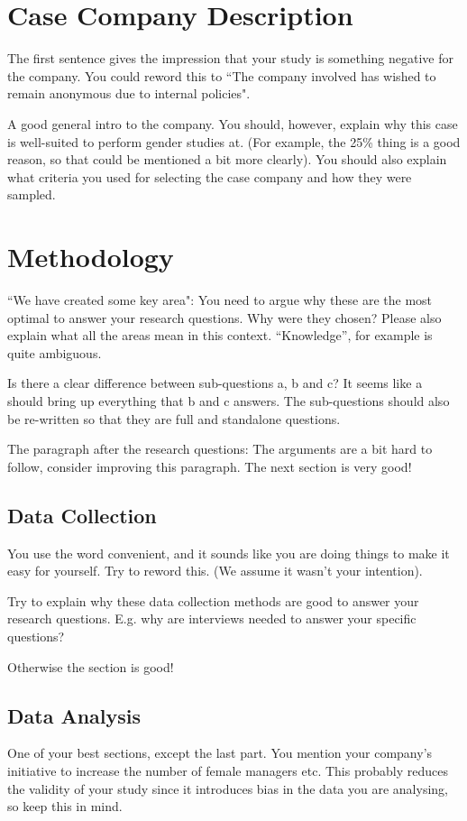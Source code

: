 \documentclass[times, 10pt,twocolumn]{article}
\begin{document}
\section{Case Company Description}
The first sentence gives the impression that your study is something negative for the company. You could reword this to ``The company involved has wished to remain anonymous due to internal policies". 

A good general intro to the company. You should, however, explain why this case is well-suited to perform gender studies at. (For example, the 25\% thing is a good reason, so that could be mentioned a bit more clearly). You should also explain what criteria you used for selecting the case company and how they were sampled. 

\section{Methodology}
``We have created some key area": You need to argue why these are the most optimal to answer your research questions. Why were they chosen? Please also explain what all the areas mean in this context. ``Knowledge'', for example is quite ambiguous. 

Is there a clear difference between sub-questions a, b and c? It seems like a should bring up everything that b and c answers. The sub-questions should also be re-written so that they are full and standalone questions. 

The paragraph after the research questions: The arguments  are a bit hard to follow, consider improving this paragraph. The next section is very good!

\subsection{Data Collection}
You use the word convenient, and it sounds like you are doing things to make it easy for yourself. Try to reword this. (We assume it wasn't your intention). 

Try to explain why these data collection methods are good to answer your research questions. E.g. why are interviews needed to answer your specific questions?

Otherwise the section is good!


\subsection{Data Analysis}
One of your best sections, except the last part. You mention your company's initiative to increase the number of female managers etc. This probably reduces the validity of your study since it introduces bias in the data you are analysing, so keep this in mind. 
\end{document}
